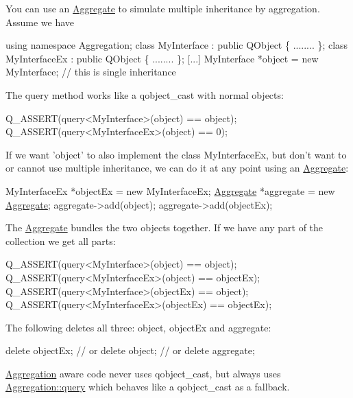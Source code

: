 You can use an \hyperlink{class_aggregation_1_1_aggregate}{Aggregate} to simulate multiple inheritance by aggregation. Assume we have 
\begin{DoxyCode}
\textcolor{keyword}{using namespace }Aggregation;
\textcolor{keyword}{class }MyInterface : \textcolor{keyword}{public} QObject \{ ........ \};
\textcolor{keyword}{class }MyInterfaceEx : \textcolor{keyword}{public} QObject \{ ........ \};
[...]
MyInterface *\textcolor{keywordtype}{object} = \textcolor{keyword}{new} MyInterface; \textcolor{comment}{// this is single inheritance}
\end{DoxyCode}
 The query method works like a qobject\-\_\-cast with normal objects\-: 
\begin{DoxyCode}
Q\_ASSERT(query<MyInterface>(\textcolor{keywordtype}{object}) == \textcolor{keywordtype}{object});
Q\_ASSERT(query<MyInterfaceEx>(\textcolor{keywordtype}{object}) == 0);
\end{DoxyCode}
 If we want 'object' to also implement the class My\-Interface\-Ex, but don't want to or cannot use multiple inheritance, we can do it at any point using an \hyperlink{class_aggregation_1_1_aggregate}{Aggregate}\-: 
\begin{DoxyCode}
MyInterfaceEx *objectEx = \textcolor{keyword}{new} MyInterfaceEx;
\hyperlink{class_aggregation_1_1_aggregate_a5579d6da6c4cf165eead1a744e2f6061}{Aggregate} *aggregate = \textcolor{keyword}{new} \hyperlink{class_aggregation_1_1_aggregate_a5579d6da6c4cf165eead1a744e2f6061}{Aggregate};
aggregate->add(\textcolor{keywordtype}{object});
aggregate->add(objectEx);
\end{DoxyCode}
 The \hyperlink{class_aggregation_1_1_aggregate}{Aggregate} bundles the two objects together. If we have any part of the collection we get all parts\-: 
\begin{DoxyCode}
Q\_ASSERT(query<MyInterface>(\textcolor{keywordtype}{object}) == \textcolor{keywordtype}{object});
Q\_ASSERT(query<MyInterfaceEx>(\textcolor{keywordtype}{object}) == objectEx);
Q\_ASSERT(query<MyInterface>(objectEx) == \textcolor{keywordtype}{object});
Q\_ASSERT(query<MyInterfaceEx>(objectEx) == objectEx);
\end{DoxyCode}
 The following deletes all three\-: object, object\-Ex and aggregate\-: 
\begin{DoxyCode}
\textcolor{keyword}{delete} objectEx;
\textcolor{comment}{// or delete object;}
\textcolor{comment}{// or delete aggregate;}
\end{DoxyCode}


\hyperlink{namespace_aggregation}{Aggregation} aware code never uses qobject\-\_\-cast, but always uses \hyperlink{namespace_aggregation_a1b5f85f4af221459c037427c41e18d98}{Aggregation\-::query} which behaves like a qobject\-\_\-cast as a fallback. 

